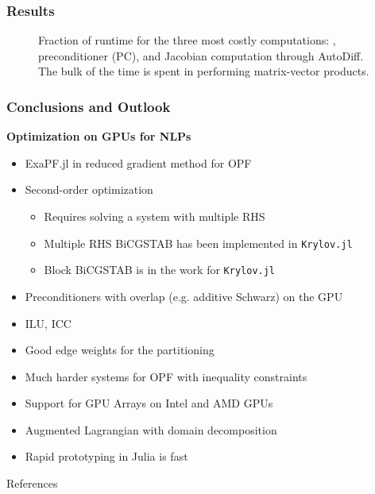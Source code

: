 \begin{frame}[fragile]
  \frametitle{Results}
\begin{figure}
\caption{Fraction of runtime for the three most costly computations: \BiCGSTAB, preconditioner (PC), and Jacobian computation through AutoDiff. The bulk of the time is spent in \BiCGSTAB performing matrix-vector products.}
\label{fig:relperformance}
\end{figure}
\end{frame}


\begin{frame}
  \frametitle{Conclusions and Outlook}
  {\bf Optimization on GPUs for NLPs}
  \begin{itemize}
    \item ExaPF.jl in reduced gradient method for OPF
    \item Second-order optimization 
    \begin{itemize}
      \item Requires solving a system with multiple RHS
      \item Multiple RHS BiCGSTAB has been implemented in \lstinline{Krylov.jl}
      \item Block BiCGSTAB is in the work for \lstinline{Krylov.jl}
    \end{itemize}
    \item Preconditioners with overlap (e.g. additive Schwarz) on the GPU
    \item ILU, ICC
    \item Good edge weights for the partitioning
    \item Much harder systems for OPF with inequality constraints
    \item Support for GPU Arrays on Intel and AMD GPUs
    \item Augmented Lagrangian with domain decomposition
    \item Rapid prototyping in Julia is fast
  \end{itemize}
\end{frame}

\begin{frame}{References}
    \printbibliography[heading=none]
\end{frame}



